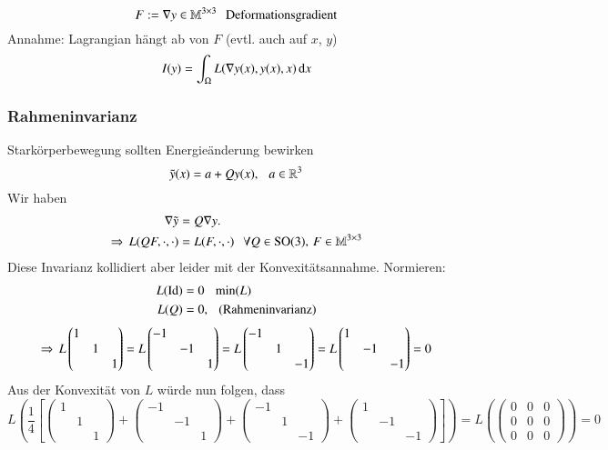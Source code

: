 \begin{beispiel}
    \[
        F:=\nabla y \in\mathbb M^{3\times 3} \hspace{.25cm} \text{Deformationsgradient}
    \]
    Annahme: Lagrangian hängt ab von $F$ (evtl. auch auf $x$, $y$)
    \[
        I(y)=\int_\Omega L(\nabla y(x), y(x), x) \, \mathrm{d} x
    \]
\end{beispiel}
\subsubsection*{Rahmeninvarianz}

Starkörperbewegung sollten Energieänderung bewirken
\[
    \tilde y(x)= a+Qy(x), \hspace{.25cm} a\in\mathbb{R}^3
\]
Wir haben
\begin{align*}
    \nabla \tilde y &= Q\nabla y.\\
    \Rightarrow \, L(QF,\cdot, \cdot) &= L(F,\cdot, \cdot) \hspace{.25cm} \forall Q\in \mathrm{SO}(3), \, F\in 
    \mathbb{M}^{3\times 3}
\end{align*}
Diese Invarianz kollidiert aber leider mit der Konvexitätsannahme. Normieren:
\begin{align*}
    L(\mathrm{Id}) &= 0 \hspace{.25cm}\min(L)\\
    L(Q)&= 0, \hspace{.25cm}\text{(Rahmeninvarianz)}
\end{align*}
    \[
        \Rightarrow \, L\begin{pmatrix} 1&&\\&1&\\&&1\end{pmatrix}
        = L\begin{pmatrix} -1&&\\&-1&\\&&1\end{pmatrix}
        =L\begin{pmatrix} -1&&\\&1&\\&&-1\end{pmatrix}
        = L\begin{pmatrix}1&&\\&-1&\\&&-1\end{pmatrix}=0
    \]
Aus der Konvexität von $L$ würde nun folgen, dass
\[
    L\left(\frac14 \left[ \begin{pmatrix} 1&&\\&1&\\&&1\end{pmatrix} 
    + \begin{pmatrix} -1&&\\&-1&\\&&1\end{pmatrix}+
        \begin{pmatrix} -1&&\\&1&\\&&-1\end{pmatrix} +
        \begin{pmatrix} 1&&\\&-1&\\&&-1\end{pmatrix}\right]\right) 
    = L\left(\begin{pmatrix}0&0&0\\0&0&0\\0&0&0\end{pmatrix}\right)=0
\]

